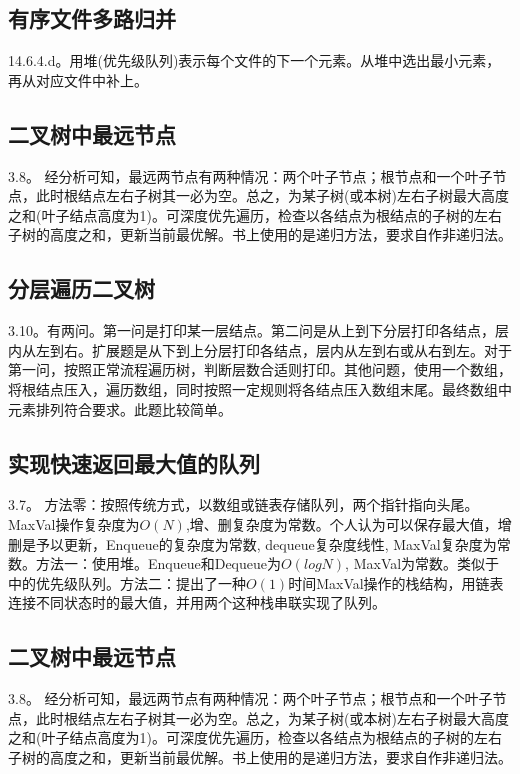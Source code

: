 \subsection{有序文件多路归并}
\cite{pp}14.6.4.d。用堆(优先级队列)表示每个文件的下一个元素。从堆中选出最小元素，再从对应文件中补上。

\subsection{二叉树中最远节点}
\cite{bop}3.8。
经分析可知，最远两节点有两种情况：两个叶子节点；根节点和一个叶子节点，此时根结点左右子树其一必为空。总之，为某子树(或本树)左右子树最大高度之和(叶子结点高度为1)。可深度优先遍历，检查以各结点为根结点的子树的左右子树的高度之和，更新当前最优解。书上使用的是递归方法，要求自作非递归法。

\subsection{分层遍历二叉树}
\cite{bop}3.10。有两问。第一问是打印某一层结点。第二问是从上到下分层打印各结点，层内从左到右。扩展题是从下到上分层打印各结点，层内从左到右或从右到左。对于第一问，按照正常流程遍历树，判断层数合适则打印。其他问题，使用一个数组，将根结点压入，遍历数组，同时按照一定规则将各结点压入数组末尾。最终数组中元素排列符合要求。此题比较简单。


\subsection{实现快速返回最大值的队列}
\cite{bop}3.7。
方法零：按照传统方式，以数组或链表存储队列，两个指针指向头尾。MaxVal操作复杂度为$O(N)$,增、删复杂度为常数。个人认为可以保存最大值，增删是予以更新，Enqueue的复杂度为常数, dequeue复杂度线性, MaxVal复杂度为常数。方法一：使用堆。Enqueue和Dequeue为$O(logN)$, MaxVal为常数。类似于\cite{ita}中的优先级队列。方法二：\cite{bop}提出了一种$O(1)$时间MaxVal操作的栈结构，用链表连接不同状态时的最大值，并用两个这种栈串联实现了队列。

\subsection{二叉树中最远节点}
\cite{bop}3.8。
经分析可知，最远两节点有两种情况：两个叶子节点；根节点和一个叶子节点，此时根结点左右子树其一必为空。总之，为某子树(或本树)左右子树最大高度之和(叶子结点高度为1)。可深度优先遍历，检查以各结点为根结点的子树的左右子树的高度之和，更新当前最优解。书上使用的是递归方法，要求自作非递归法。

